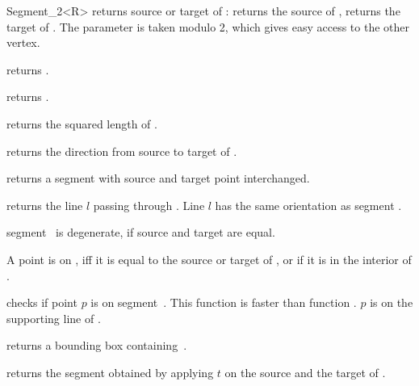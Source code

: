 \begin{ccRefClass} {Segment_2<R>}
       {returns source or target   of \ccVar:    returns
        the source of \ccVar,  returns the target of \ccVar. 
        The parameter  is taken modulo 2, which gives 
        easy access to the other vertex. }

	{returns .}

       {returns .}

       {returns the squared length of \ccVar. }

       {returns the direction from source to target of \ccVar.}


       {returns a segment with source and target point interchanged.}

       {returns the line $l$ passing through \ccVar. Line $l$  has the
        same orientation as segment \ccVar.}

\ccPredicates

       {segment \ccVar\ is degenerate, if source and target are equal.}

       {}
\ccGlue
{}
       {}

       {A point is on \ccVar, iff it is equal to the source or target 
        of \ccVar, or if it is in the interior of \ccVar.}

       {checks if point $p$ is on segment~\ccVar. This function is faster
        than function .
        \ccPrecond $p$ is on the supporting line of \ccVar.}


       {returns a bounding box containing~\ccVar.}

       {returns the segment obtained by applying $t$ on the source
        and the target of \ccVar.}

\end{ccRefClass} 
